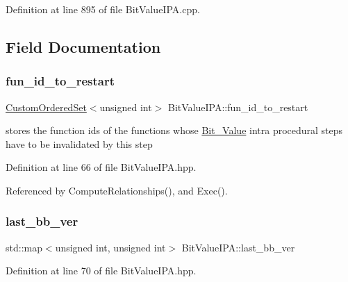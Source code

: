 Definition at line 895 of file Bit\+Value\+I\+P\+A.\+cpp.



\subsection{Field Documentation}
\mbox{\label{classBitValueIPA_a26c174c45034e2f71f54c6f12e60905c}} 
\subsubsection{\texorpdfstring{fun\+\_\+id\+\_\+to\+\_\+restart}{fun\_id\_to\_restart}}
{\footnotesize\ttfamily \hyperlink{classCustomOrderedSet}{Custom\+Ordered\+Set}$<$unsigned int$>$ Bit\+Value\+I\+P\+A\+::fun\+\_\+id\+\_\+to\+\_\+restart\hspace{0.3cm}{\ttfamily [protected]}}



stores the function ids of the functions whose \hyperlink{classBit__Value}{Bit\+\_\+\+Value} intra procedural steps have to be invalidated by this step 



Definition at line 66 of file Bit\+Value\+I\+P\+A.\+hpp.



Referenced by Compute\+Relationships(), and Exec().

\mbox{\label{classBitValueIPA_a021bda2f1b73a5221fd0c4b25f80ef1a}} 
\subsubsection{\texorpdfstring{last\+\_\+bb\+\_\+ver}{last\_bb\_ver}}
{\footnotesize\ttfamily std\+::map$<$unsigned int, unsigned int$>$ Bit\+Value\+I\+P\+A\+::last\+\_\+bb\+\_\+ver\hspace{0.3cm}{\ttfamily [protected]}}



Definition at line 70 of file Bit\+Value\+I\+P\+A.\+hpp.



